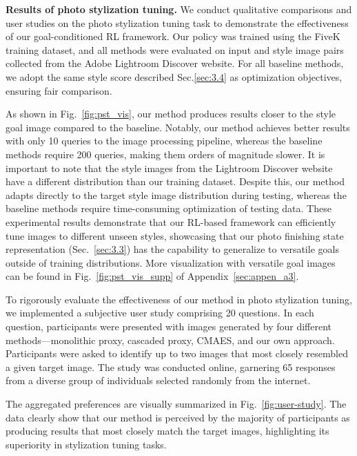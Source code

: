 \documentclass{article}
\newcommand{\pipeline}{image processing pipeline\xspace}
\newcommand{\taskPST}{photo stylization tuning\xspace}
\begin{document}
\noindent\textbf{Results of \taskPST.} We conduct qualitative comparisons and user studies on the \taskPST task to demonstrate the effectiveness of our goal-conditioned RL framework. Our policy was trained using the FiveK training dataset, and all methods were evaluated on input and style image pairs collected from the Adobe Lightroom Discover website. For all baseline methods, we adopt the same style score described Sec.\ref{sec:3.4} as optimization objectives, ensuring fair comparison.

As shown in Fig.~\ref{fig:pst_vis}, our method produces results closer to the style goal image compared to the baseline. Notably, our method achieves better results with only 10 queries to the \pipeline, whereas the baseline methods require 200 queries, making them orders of magnitude slower.
It is important to note that the style images from the Lightroom Discover website have a different distribution than our training dataset. Despite this, our method adapts directly to the target style image distribution during testing, whereas the baseline methods require time-consuming optimization of testing data. These experimental results demonstrate that our RL-based framework can efficiently tune images to different unseen styles, showcasing that our photo finishing state representation (Sec.~\ref{sec:3.3}) has the capability to generalize to versatile goals outside of training distributions. More visualization with versatile goal images can be found in Fig.~\ref{fig:pst_vis_supp} of Appendix~\ref{sec:appen_a3}.

To rigorously evaluate the effectiveness of our method in \taskPST, we implemented a subjective user study comprising 20 questions. In each question, participants were presented with images generated by four different methods—monolithic proxy, cascaded proxy, CMAES, and our own approach. Participants were asked to identify up to two images that most closely resembled a given target image. The study was conducted online, garnering 65 responses from a diverse group of individuals selected randomly from the internet.

The aggregated preferences are visually summarized in Fig.~\ref{fig:user-study}. 
The data clearly show that our method is perceived by the majority of participants as producing results that most closely match the target images, highlighting its superiority in stylization tuning tasks.
\end{document}
